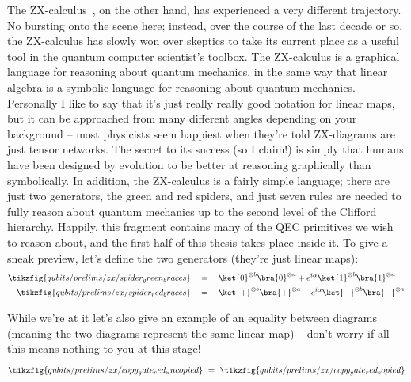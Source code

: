 The ZX-calculus~\cite{Coecke_2011}, on the other hand, has experienced a very different trajectory.
No bursting onto the scene here; instead, over the course of the last decade or so, the ZX-calculus has slowly won over skeptics to take its current place as a useful tool in the quantum computer scientist's toolbox.
The ZX-calculus is a graphical language for reasoning about quantum mechanics, in the same way that linear algebra is a symbolic language for reasoning about quantum mechanics.
Personally I like to say that it's just really really good notation for linear maps, but it can be approached from many different angles depending on your background -- most physicists seem happiest when they're told ZX-diagrams are just tensor networks.
The secret to its success (so I claim!) is simply that humans have been designed by evolution to be better at reasoning graphically than symbolically.
In addition, the ZX-calculus is a fairly simple language; there are just two generators, the green and red spiders, and just seven rules are needed to fully reason about quantum mechanics up to the second level of the Clifford hierarchy.
Happily, this fragment contains many of the QEC primitives we wish to reason about, and the first half of this thesis takes place inside it.
To give a sneak preview, let's define the two generators (they're just linear maps):
\begin{align}\label{eq:green_spider_defn_intro}
\tikzfig{qubits/prelims/zx/spider_green_braces}
\quad &= \quad
\ket{0}^{\otimes b}\bra{0}^{\otimes a} + e^{i\alpha}\ket{1}^{\otimes b}\bra{1}^{\otimes a} \\
\tikzfig{qubits/prelims/zx/spider_red_braces}
\quad &= \quad
\ket{+}^{\otimes b}\bra{+}^{\otimes a} + e^{i\alpha}\ket{-}^{\otimes b}\bra{-}^{\otimes a}
\end{align}

While we're at it let's also give an example of an equality between diagrams (meaning the two diagrams represent the same linear map) -- don't worry if all this means nothing to you at this stage!
\begin{equation}\label{eq:copy_rules_intro}
\tikzfig{qubits/prelims/zx/copy_gate_red_uncopied} ~=~ \tikzfig{qubits/prelims/zx/copy_gate_red_copied}
\end{equation}

